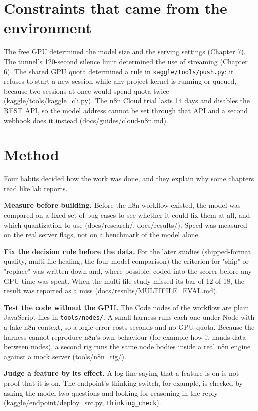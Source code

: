 \documentclass[11pt,a4paper]{report}
\begin{document}
\section{Constraints that came from the environment}

The free GPU determined the model size and the serving settings (Chapter 7). The tunnel's 120-second silence limit determined the use of streaming (Chapter 6). The shared GPU quota determined a rule in \texttt{kaggle/\allowbreak{}tools/\allowbreak{}push.\allowbreak{}py}: it refuses to start a new session while any project kernel is running or queued, because two sessions at once would spend quota twice (kaggle/tools/kaggle\_cli.py). The n8n Cloud trial lasts 14 days and disables the REST API, so the model address cannot be set through that API and a second webhook does it instead (docs/guides/cloud-n8n.md).

\section{Method}

Four habits decided how the work was done, and they explain why some chapters read like lab reports.

\textbf{Measure before building.} Before the n8n workflow existed, the model was compared on a fixed set of bug cases to see whether it could fix them at all, and which quantization to use (docs/research/, docs/results/). Speed was measured on the real server flags, not on a benchmark of the model alone.

\textbf{Fix the decision rule before the data.} For the later studies (shipped-format quality, multi-file healing, the four-model comparison) the criterion for "ship" or "replace" was written down and, where possible, coded into the scorer before any GPU time was spent. When the multi-file study missed its bar of 12 of 18, the result was reported as a miss (docs/results/MULTIFILE\_EVAL.md).

\textbf{Test the code without the GPU.} The Code nodes of the workflow are plain JavaScript files in \texttt{tools/\allowbreak{}nodes/\allowbreak{}}. A small harness runs each one under Node with a fake n8n context, so a logic error costs seconds and no GPU quota. Because the harness cannot reproduce n8n's own behaviour (for example how it hands data between nodes), a second rig runs the same node bodies inside a real n8n engine against a mock server (tools/n8n\_rig/).

\textbf{Judge a feature by its effect.} A log line saying that a feature is on is not proof that it is on. The endpoint's thinking switch, for example, is checked by asking the model two questions and looking for reasoning in the reply (kaggle/endpoint/deploy\_src.py, \texttt{thinking\_\allowbreak{}check}).
\end{document}
